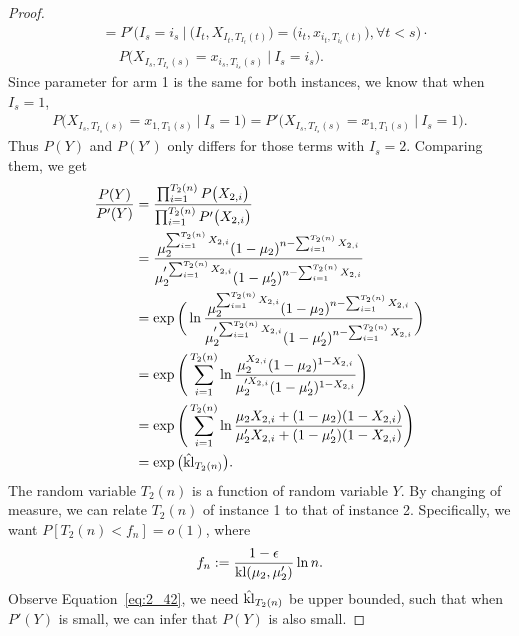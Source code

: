 \begin{proof}
\begin{equation}
\begin{split}
            &=P'\Big(I_s=i_s~\Big|~
            \big(I_t, X_{I_t, T_{I_t}(t)}\big)=\big(i_t, x_{i_t, T_{i_t}(t)}\big), \forall t<s\Big) \cdot \\
            &\quad~P\Big(X_{I_s, T_{I_s}(s)}=x_{i_s, T_{i_s}(s)}~\Big|~I_s=i_s\Big).
        \end{split}
    \end{equation}
    Since parameter for arm 1 is the same for both instances, we know that when $I_s=1$,
    \begin{align}
        P\Big(X_{I_s, T_{I_s}(s)}=x_{1, T_{1}(s)}~\Big|~I_s=1\Big) = P'\Big(X_{I_s, T_{I_s}(s)}=x_{1, T_{1}(s)}~\Big|~I_s=1\Big).
    \end{align}
    Thus $P(Y)$ and $P(Y')$ only differs for those terms with $I_s=2$.
    Comparing them, we get
    \begin{align}
        \frac{P(Y)}{P'(Y)}
            &= \frac{\prod_{i=1}^{T_2(n)}P\big(X_{2, i}\big)}{\prod_{i=1}^{T_2(n)}P'\big(X_{2, i}\big)} \\
            &= \frac{\mu_2^{\sum_{i=1}^{T_2(n)} X_{2,i}}(1-\mu_2)^{n-\sum_{i=1}^{T_2(n)} X_{2,i}}}
                {\mu_2'^{\sum_{i=1}^{T_2(n)} X_{2,i}}(1-\mu_2')^{n-\sum_{i=1}^{T_2(n)} X_{2,i}}} \\
            &= \exp\bigg(\ln
                \frac{\mu_2^{\sum_{i=1}^{T_2(n)} X_{2,i}}(1-\mu_2)^{n-\sum_{i=1}^{T_2(n)} X_{2,i}}}
                {\mu_2'^{\sum_{i=1}^{T_2(n)} X_{2,i}}(1-\mu_2')^{n-\sum_{i=1}^{T_2(n)} X_{2,i}}}\bigg) \\
            &= \exp\Bigg(\sum_{i=1}^{T_2(n)} \ln
                \frac{\mu_2^{X_{2,i}}(1-\mu_2)^{1-X_{2,i}}}
                {\mu_2'^{X_{2,i}}(1-\mu_2')^{1-X_{2,i}}}\Bigg) \\
            &= \exp\Bigg(\sum_{i=1}^{T_2(n)} \ln
                \frac{\mu_2 X_{2,i} + (1-\mu_2) (1-X_{2,i})}
                {\mu_2' X_{2,i} + (1-\mu_2')(1-X_{2,i})}\Bigg) \\
            &= \exp\big(\hat{{\mathop{\mathrm{kl}}}}_{T_2(n)}\big).\label{eq:2_42}
    \end{align}
    The random variable $T_2(n)$ is a function of random variable $Y$.
    By changing of measure,
    we can relate $T_2(n)$ of instance 1 to that of instance 2.
    Specifically, we want $P[T_2(n)<f_n]=o(1)$, where
    \begin{equation}
        f_n:=\frac{1-\epsilon}{{\mathop{\mathrm{kl}}}(\mu_2,\mu_2')}\ln n.
    \end{equation}
    Observe Equation~\eqref{eq:2_42}, we need $\hat{{\mathop{\mathrm{kl}}}}_{T_2(n)}$ be upper bounded,
    such that when $P'(Y)$ is small, we can infer that $P(Y)$ is also small.

\end{proof}
